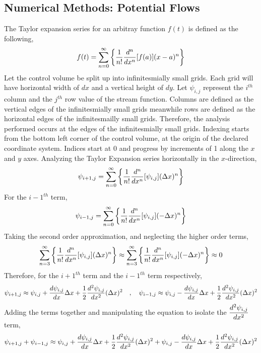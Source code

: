 \documentclass[class=report, 12pt, crop=false]{standalone}
\begin{document}
\begin{center}
\chapter{Numerical Methods: Potential Flows}
\begin{comment}
Only for 2D , next time please expand to 3D!
\end{comment}
\begin{comment}
\end{comment}
The Taylor expansion series for an arbitray function $f(t)$ is defined as the following,
$$f(t) = \sum^{\infty}_{n = 0}\left\{\frac{1}{n!}\frac{d^n}{dx^n}[f(a)](x - a)^n\right\}$$
Let the control volume be split up into infinitesmially small grids. Each grid will have horizontal width of $dx$ and a vertical height of $dy$. Let $\psi_{i,j}$ represent the $i^{th}$ column and the $j^{th}$ row value of the stream function. Columns are defined as the vertical edges of the infinitesmially small grids meanwhile rows are defined as the horizontal edges of the infinitesmailly small grids. Therefore, the analysis performed occurs at the edges of the infinitesmially small grids. Indexing starts from the bottom left corner of the control volume, at the origin of the declared coordinate system. Indices start at 0 and progress by increments of 1 along the $x$ and $y$ axes. Analyzing the Taylor Expansion series horizontally in the $x$-direction,
$$\psi_{i + 1,j} = \sum^{\infty}_{n = 0}\left\{\frac{1}{n!}\frac{d^n}{dx^n}[\psi_{i,j}](\Delta x)^n\right\}$$
For the ${i - 1}^{th}$ term,
$$\psi_{i - 1,j} = \sum^{\infty}_{n = 0}\left\{\frac{1}{n!}\frac{d^n}{dx^n}[\psi_{i,j}](-\Delta x)^n\right\}$$
Taking the second order approximation, and neglecting the higher order terms,
$$\sum^{\infty}_{n = 3}\left\{\frac{1}{n!}\frac{d^n}{dx^n}[\psi_{i,j}](\Delta x)^n\right\}\approx \sum^{\infty}_{n = 3}\left\{\frac{1}{n!}\frac{d^n}{dx^n}[\psi_{i,j}](-\Delta x)^n\right\}\approx 0$$
Therefore, for the ${i + 1}^{th}$ term and the ${i - 1}^{th}$ term respectively,
$$\psi_{i + 1,j} \approx \psi_{i,j} + \frac{d\psi_{i,j}}{dx}\Delta x + \frac{1}{2}\frac{d^2\psi_{i,j}}{dx^2}(\Delta x)^2 \quad,\quad \psi_{i - 1,j} \approx \psi_{i,j} - \frac{d\psi_{i,j}}{dx}\Delta x + \frac{1}{2}\frac{d^2\psi_{i,j}}{dx^2}(\Delta x)^2$$
Adding the terms together and manipulating the equation to isolate the $\displaystyle{\frac{d^2\psi_{i,j}}{dx^2}}$ term,
$$\psi_{i + 1,j} + \psi_{i - 1,j} \approx \psi_{i,j} + \frac{d\psi_{i,j}}{dx}\Delta x + \frac{1}{2}\frac{d^2\psi_{i,j}}{dx^2}(\Delta x)^2 + \psi_{i,j} - \frac{d\psi_{i,j}}{dx}\Delta x + \frac{1}{2}\frac{d^2\psi_{i,j}}{dx^2}(\Delta x)^2$$

\end{center}
\end{document}
